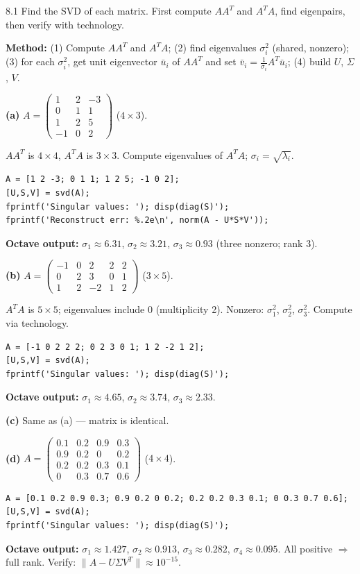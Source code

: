\begin{exercise}{8.1}
Find the SVD of each matrix. First compute $AA^T$ and $A^TA$, find eigenpairs, then verify with technology.
\end{exercise}
\begin{solution}
\textbf{Method:} (1) Compute $AA^T$ and $A^TA$; (2) find eigenvalues $\sigma_i^2$ (shared, nonzero); (3) for each $\sigma_i^2$, get unit eigenvector $\bar{u}_i$ of $AA^T$ and set $\bar{v}_i=\frac{1}{\sigma_i}A^T\bar{u}_i$; (4) build $U$, $\Sigma$, $V$.

\textbf{(a)} $A=\begin{pmatrix}1&2&-3\\0&1&1\\1&2&5\\-1&0&2\end{pmatrix}$ ($4\times3$).

$AA^T$ is $4\times4$, $A^TA$ is $3\times3$. Compute eigenvalues of $A^TA$; $\sigma_i=\sqrt{\lambda_i}$.
\begin{lstlisting}
A = [1 2 -3; 0 1 1; 1 2 5; -1 0 2];
[U,S,V] = svd(A);
fprintf('Singular values: '); disp(diag(S)');
fprintf('Reconstruct err: %.2e\n', norm(A - U*S*V'));
\end{lstlisting}
\textbf{Octave output:} $\sigma_1\approx6.31$, $\sigma_2\approx3.21$, $\sigma_3\approx0.93$ (three nonzero; rank 3).

\textbf{(b)} $A=\begin{pmatrix}-1&0&2&2&2\\0&2&3&0&1\\1&2&-2&1&2\end{pmatrix}$ ($3\times5$).

$A^TA$ is $5\times5$; eigenvalues include 0 (multiplicity 2). Nonzero: $\sigma_1^2$, $\sigma_2^2$, $\sigma_3^2$. Compute via technology.

\begin{lstlisting}
A = [-1 0 2 2 2; 0 2 3 0 1; 1 2 -2 1 2];
[U,S,V] = svd(A);
fprintf('Singular values: '); disp(diag(S)');
\end{lstlisting}
\textbf{Octave output:} $\sigma_1\approx4.65$, $\sigma_2\approx3.74$, $\sigma_3\approx2.33$.

\textbf{(c)} Same as (a) --- matrix is identical.

\textbf{(d)} $A=\begin{pmatrix}0.1&0.2&0.9&0.3\\0.9&0.2&0&0.2\\0.2&0.2&0.3&0.1\\0&0.3&0.7&0.6\end{pmatrix}$ ($4\times4$).

\begin{lstlisting}
A = [0.1 0.2 0.9 0.3; 0.9 0.2 0 0.2; 0.2 0.2 0.3 0.1; 0 0.3 0.7 0.6];
[U,S,V] = svd(A);
fprintf('Singular values: '); disp(diag(S)');
\end{lstlisting}
\textbf{Octave output:} $\sigma_1\approx1.427$, $\sigma_2\approx0.913$, $\sigma_3\approx0.282$, $\sigma_4\approx0.095$. All positive $\Rightarrow$ full rank. Verify: $\|A-U\Sigma V^T\|\approx10^{-15}$.
\end{solution}
